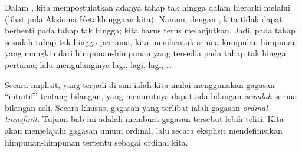 \documentclass[../../../include/open-logic-section]{subfiles}
\begin{document}


Dalam , kita mempostulatkan adanya tahap tak hingga dalam
hierarki melalui \stagesinf{} (lihat pula Aksioma Ketakhinggaan kita).
Namun, dengan \stagessucc{}, kita tidak dapat berhenti pada tahap tak hingga;
kita harus terus melanjutkan. Jadi, pada tahap sesudah tahap
tak hingga pertama, kita membentuk semua kumpulan himpunan yang mungkin dari
himpunan-himpunan yang tersedia pada tahap tak hingga pertama; lalu
mengulanginya lagi, lagi, lagi, \dots

Secara implisit, yang terjadi di sini ialah kita mulai menggunakan gagasan
``intuitif'' tentang bilangan, yang menurutnya dapat ada bilangan
\emph{sesudah} semua bilangan asli. Secara khusus, gagasan yang terlibat ialah
gagasan \emph{ordinal transfinit}. Tujuan bab ini adalah membuat gagasan
tersebut lebih teliti. Kita akan menjelajahi gagasan umum ordinal, lalu secara
eksplisit mendefinisikan himpunan-himpunan tertentu sebagai ordinal kita.
\end{document}
